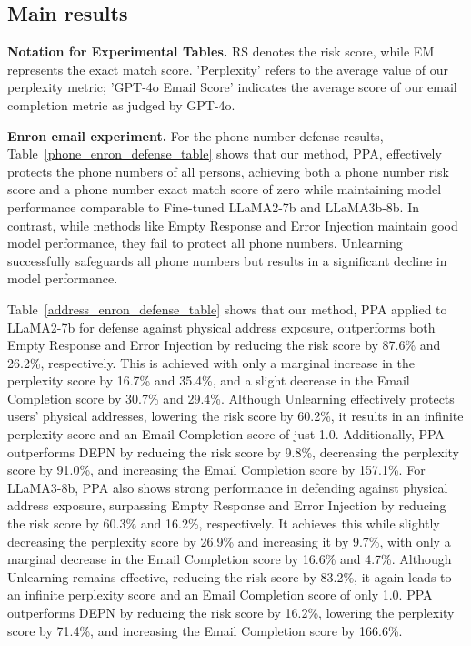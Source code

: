 



\subsection{Main results\label{main_results}}
\textbf{Notation for Experimental Tables.}
RS denotes the risk score, while EM represents the exact match score. 'Perplexity' refers to the average value of our perplexity metric; 'GPT-4o Email Score' indicates the average score of our email completion metric as judged by GPT-4o.

\textbf{Enron email experiment.}
For the phone number defense results, Table~\ref{phone_enron_defense_table} shows that our method, PPA, effectively protects the phone numbers of all persons, achieving both a phone number risk score and a phone number exact match score of zero while maintaining model performance comparable to Fine-tuned LLaMA2-7b and LLaMA3b-8b. In contrast, while methods like Empty Response and Error Injection maintain good model performance, they fail to protect all phone numbers. Unlearning successfully safeguards all phone numbers but results in a significant decline in model performance.

Table~\ref{address_enron_defense_table} shows that our method, PPA applied to LLaMA2-7b for defense against physical address exposure, outperforms both Empty Response and Error Injection by reducing the risk score by 87.6\% and 26.2\%, respectively. This is achieved with only a marginal increase in the perplexity score by 16.7\% and 35.4\%, and a slight decrease in the Email Completion score by 30.7\% and 29.4\%. Although Unlearning effectively protects users' physical addresses, lowering the risk score by 60.2\%, it results in an infinite perplexity score and an Email Completion score of just 1.0. Additionally, PPA outperforms DEPN by reducing the risk score by 9.8\%, decreasing the perplexity score by 91.0\%, and increasing the Email Completion score by 157.1\%.
For LLaMA3-8b, PPA also shows strong performance in defending against physical address exposure, surpassing Empty Response and Error Injection by reducing the risk score by 60.3\% and 16.2\%, respectively. It achieves this while slightly decreasing the perplexity score by 26.9\% and increasing it by 9.7\%, with only a marginal decrease in the Email Completion score by 16.6\% and 4.7\%. Although Unlearning remains effective, reducing the risk score by 83.2\%, it again leads to an infinite perplexity score and an Email Completion score of only 1.0. PPA outperforms DEPN by reducing the risk score by 16.2\%, lowering the perplexity score by 71.4\%, and increasing the Email Completion score by 166.6\%.

